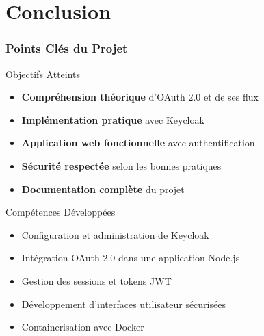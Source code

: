 \documentclass[aspectratio=169]{beamer}
\begin{document}
\section{Conclusion}

\begin{frame}
    \frametitle{Points Clés du Projet}
    \begin{block}{Objectifs Atteints}
        \begin{itemize}
            \item \textbf{Compréhension théorique} d'OAuth 2.0 et de ses flux
            \item \textbf{Implémentation pratique} avec Keycloak
            \item \textbf{Application web fonctionnelle} avec authentification
            \item \textbf{Sécurité respectée} selon les bonnes pratiques
            \item \textbf{Documentation complète} du projet
        \end{itemize}
    \end{block}
    
    \begin{block}{Compétences Développées}
        \begin{itemize}
            \item Configuration et administration de Keycloak
            \item Intégration OAuth 2.0 dans une application Node.js
            \item Gestion des sessions et tokens JWT
            \item Développement d'interfaces utilisateur sécurisées
            \item Containerisation avec Docker
        \end{itemize}
    \end{block}
\end{frame}
\end{document}
